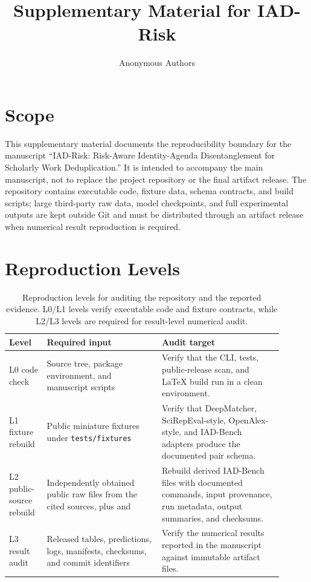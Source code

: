 \documentclass[11pt]{article}
\title{Supplementary Material for IAD-Risk}
\author{Anonymous Authors}
\date{}
\begin{document}
\maketitle

\section{Scope}

This supplementary material documents the reproducibility boundary for the manuscript ``IAD-Risk: Risk-Aware Identity-Agenda Disentanglement for Scholarly Work Deduplication.'' It is intended to accompany the main manuscript, not to replace the project repository or the final artifact release. The repository contains executable code, fixture data, schema contracts, and build scripts; large third-party raw data, model checkpoints, and full experimental outputs are kept outside Git and must be distributed through an artifact release when numerical result reproduction is required.

\section{Reproduction Levels}

\begin{table}[H]
\caption{Reproduction levels for auditing the repository and the reported evidence. L0/L1 levels verify executable code and fixture contracts, while L2/L3 levels are required for result-level numerical audit.}
\label{tab:reproduction-levels}
\centering
\small
\begin{tabular}{L{0.12\linewidth}L{0.38\linewidth}L{0.40\linewidth}}
\toprule
Level & Required input & Audit target \\
\midrule
L0 code check & Source tree, package environment, and manuscript scripts & Verify that the CLI, tests, public-release scan, and LaTeX build run in a clean environment. \\
L1 fixture rebuild & Public miniature fixtures under \texttt{tests/fixtures} & Verify that DeepMatcher, SciRepEval-style, OpenAlex-style, and IAD-Bench adapters produce the documented pair schema. \\
L2 public-source rebuild & Independently obtained public raw files from the cited sources, plus  and  & Rebuild derived IAD-Bench files with documented commands, input provenance, run metadata, output summaries, and checksums. \\
L3 result audit & Released tables, predictions, logs, manifests, checksums, and commit identifiers & Verify the numerical results reported in the manuscript against immutable artifact files. \\
\bottomrule
\end{tabular}
\end{table}
\end{document}
